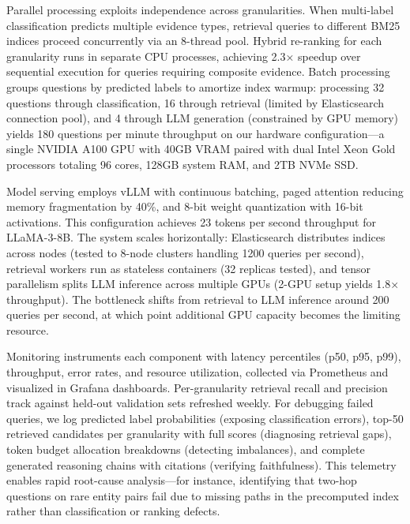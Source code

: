 \documentclass[conference]{IEEEtran}
\begin{document}
Parallel processing exploits independence across granularities. When multi-label classification predicts multiple evidence types, retrieval queries to different BM25 indices proceed concurrently via an 8-thread pool. Hybrid re-ranking for each granularity runs in separate CPU processes, achieving 2.3× speedup over sequential execution for queries requiring composite evidence. Batch processing groups questions by predicted labels to amortize index warmup: processing 32 questions through classification, 16 through retrieval (limited by Elasticsearch connection pool), and 4 through LLM generation (constrained by GPU memory) yields 180 questions per minute throughput on our hardware configuration—a single NVIDIA A100 GPU with 40GB VRAM paired with dual Intel Xeon Gold processors totaling 96 cores, 128GB system RAM, and 2TB NVMe SSD.

Model serving employs vLLM \cite{kwon2023vllm} with continuous batching, paged attention reducing memory fragmentation by 40\%, and 8-bit weight quantization with 16-bit activations. This configuration achieves 23 tokens per second throughput for LLaMA-3-8B. The system scales horizontally: Elasticsearch distributes indices across nodes (tested to 8-node clusters handling 1200 queries per second), retrieval workers run as stateless containers (32 replicas tested), and tensor parallelism splits LLM inference across multiple GPUs (2-GPU setup yields 1.8× throughput). The bottleneck shifts from retrieval to LLM inference around 200 queries per second, at which point additional GPU capacity becomes the limiting resource.

Monitoring instruments each component with latency percentiles (p50, p95, p99), throughput, error rates, and resource utilization, collected via Prometheus and visualized in Grafana dashboards. Per-granularity retrieval recall and precision track against held-out validation sets refreshed weekly. For debugging failed queries, we log predicted label probabilities (exposing classification errors), top-50 retrieved candidates per granularity with full scores (diagnosing retrieval gaps), token budget allocation breakdowns (detecting imbalances), and complete generated reasoning chains with citations (verifying faithfulness). This telemetry enables rapid root-cause analysis—for instance, identifying that two-hop questions on rare entity pairs fail due to missing paths in the precomputed index rather than classification or ranking defects.
\end{document}
